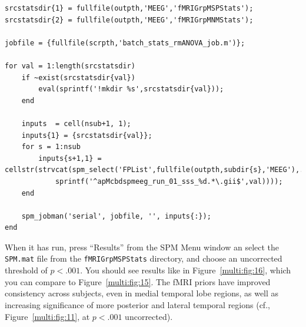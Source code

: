 \begin{lstlisting}[style=Matlab-editor,basicstyle=\mlttfamily\footnotesize]
srcstatsdir{1} = fullfile(outpth,'MEEG','fMRIGrpMSPStats');
srcstatsdir{2} = fullfile(outpth,'MEEG','fMRIGrpMNMStats');

jobfile = {fullfile(scrpth,'batch_stats_rmANOVA_job.m')};

for val = 1:length(srcstatsdir)
    if ~exist(srcstatsdir{val})
        eval(sprintf('!mkdir %s',srcstatsdir{val}));
    end
    
    inputs  = cell(nsub+1, 1);    
    inputs{1} = {srcstatsdir{val}};    
    for s = 1:nsub
        inputs{s+1,1} = cellstr(strvcat(spm_select('FPList',fullfile(outpth,subdir{s},'MEEG'),...
            sprintf('^apMcbdspmeeg_run_01_sss_%d.*\.gii$',val))));   
    end
    
    spm_jobman('serial', jobfile, '', inputs{:});
end
\end{lstlisting}

When it has run, press ``Results'' from the SPM Menu window an select the \texttt{SPM.mat} file from the \texttt{fMRIGrpMSPStats} directory, and choose an uncorrected threshold of \(p<.001\). You should see results like in Figure~\ref{multi:fig:16}, which you can compare to Figure~\ref{multi:fig:15}. The fMRI priors have improved consistency across subjects, even in medial temporal lobe regions, as well as increasing significance of more posterior and lateral temporal regions (cf., Figure~\ref{multi:fig:11}, at \(p<.001\) uncorrected).

